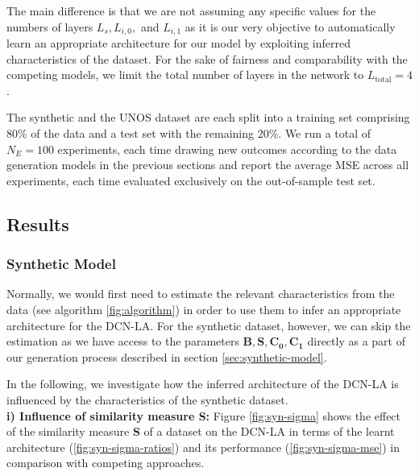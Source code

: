 The main difference is that we are not assuming any specific values for the numbers of layers $L_s, L_{i,0},$ and $L_{i,1}$ as it is our very objective to automatically learn an appropriate architecture for our model by exploiting inferred characteristics of the dataset. For the sake of fairness and  comparability with the competing models, we limit the total number of layers in the network to $L_{\text{total}} = 4$. 

The synthetic and the UNOS dataset are each split into a training set comprising 80\% of the data and a test set with the remaining 20\%. We run a total of $N_E = 100$ experiments, each time drawing new outcomes according to the data generation models in the previous sections
and report the average MSE across all experiments, each time evaluated exclusively on the out-of-sample test set. 


\subsection{Results}

\subsubsection{Synthetic Model}
Normally, we would first need to estimate the relevant characteristics from the data (see algorithm \ref{fig:algorithm}) in order to use them to infer an appropriate architecture for the DCN-LA. For the synthetic dataset, however, we can skip the estimation as we have access to the parameters $\mathbf{B}, \mathbf{S}, \mathbf{C_0}, \mathbf{C_1}$ directly as a part of our generation process described in  section \ref{sec:synthetic-model}. 

In the following, we investigate how the inferred architecture of the DCN-LA is influenced by the characteristics of the synthetic dataset.  \\

\textbf{i) Influence of similarity measure S:} 
Figure \ref{fig:syn-sigma} shows the effect of the similarity measure \textbf{S} of a dataset on the DCN-LA in terms of the learnt architecture (\ref{fig:syn-sigma-ratios}) and its performance (\ref{fig:syn-sigma-mse}) in comparison with competing approaches. 

